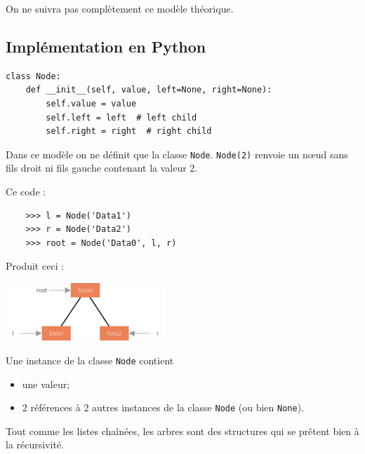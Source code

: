 \documentclass[10pt,firamath,cours]{nsi}
\begin{document}
On ne suivra pas complètement ce modèle théorique.


\subsection{Implémentation en Python}
\begin{pyc}
    \begin{verbatim}
class Node:
    def __init__(self, value, left=None, right=None):
        self.value = value
        self.left = left  # left child
        self.right = right  # right child
\end{verbatim}
\end{pyc}


Dans ce modèle on ne définit que la classe \texttt{Node}. \texttt{Node(2)} renvoie un n\oe ud sans fils droit ni fils gauche contenant la valeur 2.

\begin{exemple}[]
    Ce code :
    \begin{verbatim}
    >>> l = Node('Data1')
    >>> r = Node('Data2')
    >>> root = Node('Data0', l, r)
    \end{verbatim}
    
    Produit ceci : 
    \begin{center}
        \includegraphics[width=6cm]{img/arbre_bin_4}
    \end{center}
\end{exemple}


\begin{remarque}[]
    Une instance de la classe \texttt{Node} contient 
    \begin{itemize}
        \item une valeur;
        \item 2 références à 2 autres instances de la classe \texttt{Node} (ou bien \texttt{None}).
    \end{itemize}
    Tout comme les listes chaînées, les arbres sont des structures qui se prêtent bien à la récursivité.
\end{remarque}
\end{document}
